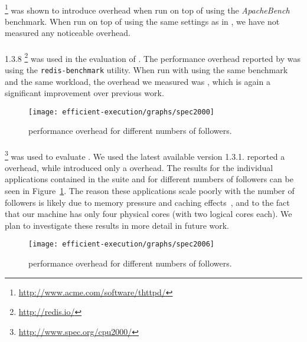 \paragraph{\thttpd}\footnote{\url{http://www.acme.com/software/thttpd/}}
was shown to introduce \tachyonThttpd overhead when run on top of
\tachyon using the \emph{ApacheBench} benchmark. When run on top of
\varan using the same settings as in \cite{tachyon12}, we have not
measured any noticeable overhead.

\paragraph{\redis} 1.3.8 \footnote{\url{http://redis.io/}}
was used in the evaluation of \mx.  The performance
overhead reported by \mx was \mxRedis using the \lstinline`redis-benchmark`
utility. When run with \varan using the same benchmark and the same workload,
the overhead we measured was \redisOneFollower, which is again a significant
improvement over previous work.

\begin{figure}[!t]
  \centering
  \texttt{[image: efficient-execution/graphs/spec2000]}
  \caption{\speczerozero performance overhead for different numbers of followers.}
  \label{fig:spec2000}
\end{figure}

\paragraph{\speczerozero}\footnote{\url{http://www.spec.org/cpu2000/}} 
was used to evaluate \orchestra.  We used the latest available version
1.3.1.  \orchestra reported a \orchestraSpec overhead, while \varan
introduced only a \speczerozeroOneFollower overhead. The results for
the individual applications contained in the \speczerozero suite and
for different numbers of followers can be seen in
Figure~\ref{fig:spec2000}. The reason these applications scale poorly
with the number of followers is likely due to memory pressure and
caching effects~\cite{jaleel07}, and to the fact that our machine has
only four physical cores (with two logical cores each).  We plan to
investigate these results in more detail in future work.

\begin{figure}[!t]
  \centering
  \texttt{[image: efficient-execution/graphs/spec2006]}
  \caption{\speczerosix performance overhead for different numbers of followers.}
  \label{fig:spec2006}
\end{figure}

